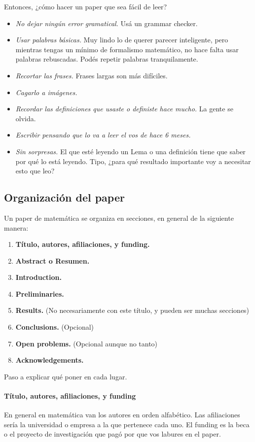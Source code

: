 \documentclass{article}
\begin{document}
Entonces, ¿cómo hacer un paper que sea fácil de leer?
\begin{itemize}
\item\emph{No dejar ningún error gramatical.} Usá un grammar checker.
\item\emph{Usar palabras básicas.} Muy lindo lo de querer parecer inteligente, pero mientras tengas un mínimo de formalismo matemático, no hace falta usar palabras rebuscadas. Podés repetir palabras tranquilamente.
\item\emph{Recortar las frases.} Frases largas son más difíciles.
\item\emph{Cagarlo a imágenes.}
\item\emph{Recordar las definiciones que usaste o definiste hace mucho.} La gente se olvida.
\item\emph{Escribir pensando que lo va a leer el vos de hace 6 meses.}
\item\emph{Sin sorpresas.} El que esté leyendo un Lema o una definición tiene que saber por qué lo está leyendo. Tipo, ¿para qué resultado importante voy a necesitar esto que leo? 
\end{itemize}

\subsection{Organización del paper}

Un paper de matemática se organiza en secciones, en general de la siguiente manera:
\begin{enumerate}
\item \textbf{Título, autores, afiliaciones, y funding.}
\item \textbf{Abstract o Resumen.}
\item \textbf{Introduction.}
\item \textbf{Preliminaries.}
\item \textbf{Results.} (No necesariamente con este título, y pueden ser muchas secciones)
\item \textbf{Conclusions.} (Opcional)
\item \textbf{Open problems.} (Opcional aunque no tanto)
\item \textbf{Acknowledgements.}
\end{enumerate}

Paso a explicar qué poner en cada lugar.
\paragraph{Título, autores, afiliaciones, y funding} En general en matemática van los autores en orden alfabético. Las afiliaciones sería la universidad o empresa a la que pertenece cada uno. El funding es la beca o el proyecto de investigación que pagó por que vos labures en el paper.
\end{document}
